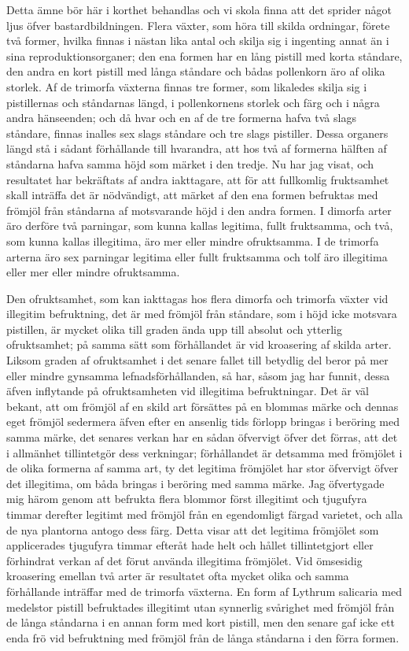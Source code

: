Detta ämne bör här i korthet behandlas och vi skola finna att det sprider något ljus öfver bastardbildningen. Flera växter, som höra till skilda ordningar, förete två former, hvilka finnas i nästan lika antal och skilja sig i ingenting annat än i sina reproduktionsorganer; den ena formen har en lång pistill med korta ståndare, den andra en kort pistill med långa ståndare och bådas pollenkorn äro af olika storlek. Af de trimorfa växterna finnas tre former, som likaledes skilja sig i pistillernas och ståndarnas längd, i pollenkornens storlek och färg och i några andra hänseenden; och då hvar och en af de tre formerna hafva två slags ståndare, finnas inalles sex slags ståndare och tre slags pistiller. Dessa organers längd stå i sådant förhållande till hvarandra, att hos två af formerna hälften af ståndarna hafva samma höjd som märket i den tredje. Nu har jag visat, och resultatet har bekräftats af andra iakttagare, att för att fullkomlig fruktsamhet skall inträffa det är nödvändigt, att märket af den ena formen befruktas med frömjöl från ståndarna af motsvarande höjd i den andra formen. I dimorfa arter äro derföre två parningar, som kunna kallas legitima, fullt fruktsamma, och två, som kunna kallas illegitima, äro mer eller mindre ofruktsamma. I de trimorfa arterna äro sex parningar legitima eller fullt fruktsamma och tolf äro illegitima eller mer eller mindre ofruktsamma.

Den ofruktsamhet, som kan iakttagas hos flera dimorfa och trimorfa växter vid illegitim befruktning, det är med frömjöl från ståndare, som i höjd icke motsvara pistillen, är mycket olika till graden ända upp till absolut och ytterlig ofruktsamhet; på samma sätt som förhållandet är vid kroasering af skilda arter. Liksom graden af ofruktsamhet i det senare fallet till betydlig del beror på mer eller mindre gynsamma lefnadsförhållanden, så har, såsom jag har funnit, dessa äfven inflytande på ofruktsamheten vid illegitima befruktningar. Det är väl bekant, att om frömjöl af en skild art försättes på en blommas märke och dennas eget frömjöl sedermera äfven efter en ansenlig tids förlopp bringas i beröring med samma märke, det senares verkan har en sådan öfvervigt öfver det förras, att det i allmänhet tillintetgör dess verkningar; förhållandet är detsamma med frömjölet i de olika formerna af samma art, ty det legitima frömjölet har stor öfvervigt öfver det illegitima, om båda bringas i beröring med samma märke. Jag öfvertygade mig härom genom att befrukta flera blommor först illegitimt och tjugufyra timmar derefter legitimt med frömjöl från en egendomligt färgad varietet, och alla de nya plantorna antogo dess färg. Detta visar att det legitima frömjölet som applicerades tjugufyra timmar efteråt hade helt och hållet tillintetgjort eller förhindrat verkan af det förut använda illegitima frömjölet. Vid ömsesidig kroasering emellan två arter är resultatet ofta mycket olika och samma förhållande inträffar med de trimorfa växterna. En form af Lythrum salicaria med medelstor pistill befruktades illegitimt utan synnerlig svårighet med frömjöl från de långa ståndarna i en annan form med kort pistill, men den senare gaf icke ett enda frö vid befruktning med frömjöl från de långa ståndarna i den förra formen.

